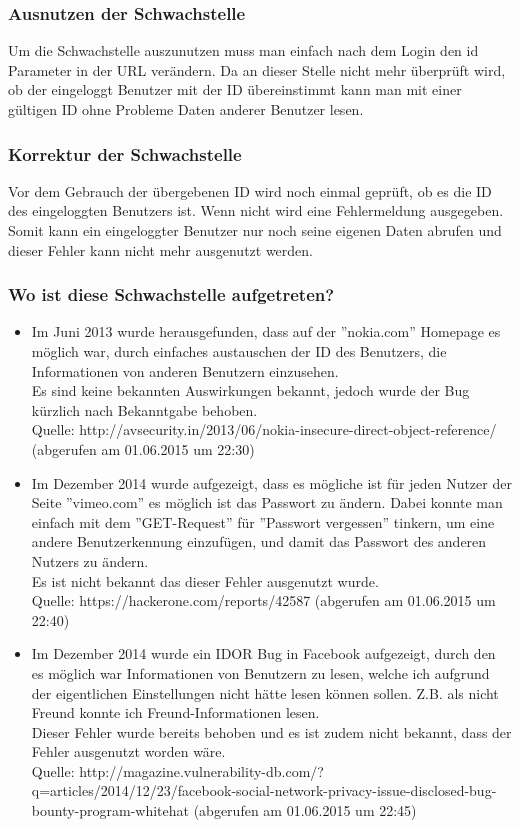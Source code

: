 \documentclass[12pt,a4paper,titlepage,oneside]{scrartcl}
\begin{document}
\subsubsection{Ausnutzen der Schwachstelle}
Um die Schwachstelle auszunutzen muss man einfach nach dem Login den id Parameter in der URL verändern. Da an dieser Stelle nicht mehr überprüft wird, ob der eingeloggt Benutzer mit der ID übereinstimmt kann man mit einer gültigen ID ohne Probleme Daten anderer Benutzer lesen.

\subsubsection{Korrektur der Schwachstelle}
Vor dem Gebrauch der übergebenen ID wird noch einmal geprüft, ob es die ID des eingeloggten Benutzers ist. Wenn nicht wird eine Fehlermeldung ausgegeben. Somit kann ein eingeloggter Benutzer nur noch seine eigenen Daten abrufen und dieser Fehler kann nicht mehr ausgenutzt werden.

\subsubsection{Wo ist diese Schwachstelle aufgetreten?}

\begin{itemize}
	\item Im Juni 2013 wurde herausgefunden, dass auf der ''nokia.com'' Homepage es möglich war, durch einfaches austauschen der ID des Benutzers, die Informationen von anderen Benutzern einzusehen. \\
	Es sind keine bekannten Auswirkungen bekannt, jedoch wurde der Bug kürzlich nach Bekanntgabe behoben. \\
	Quelle: http://avsecurity.in/2013/06/nokia-insecure-direct-object-reference/ (abgerufen am 01.06.2015 um 22:30)
	\item Im Dezember 2014 wurde aufgezeigt, dass es mögliche ist für jeden Nutzer der Seite ''vimeo.com'' es möglich ist das Passwort zu ändern. Dabei konnte man einfach mit dem ''GET-Request'' für ''Passwort vergessen'' tinkern, um eine andere Benutzerkennung einzufügen, und damit das Passwort des anderen Nutzers zu ändern. \\
	Es ist nicht bekannt das dieser Fehler ausgenutzt wurde. \\
	Quelle: https://hackerone.com/reports/42587 (abgerufen am 01.06.2015 um 22:40)
	\item Im Dezember 2014 wurde ein IDOR Bug in Facebook aufgezeigt, durch den es möglich war Informationen von Benutzern zu lesen, welche ich aufgrund der eigentlichen Einstellungen nicht hätte lesen können sollen. Z.B. als nicht Freund konnte ich Freund-Informationen lesen. \\
	Dieser Fehler wurde bereits behoben und es ist zudem nicht bekannt, dass der Fehler ausgenutzt worden wäre. \\
	Quelle: http://magazine.vulnerability-db.com/?q=articles/2014/12/23/facebook-social-network-privacy-issue-disclosed-bug-bounty-program-whitehat (abgerufen am 01.06.2015 um 22:45)
\end{itemize}

%
%
\end{document}

